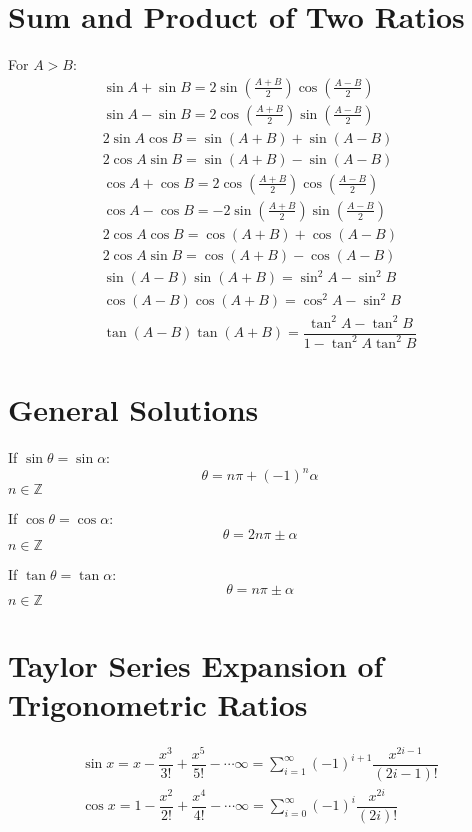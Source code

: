 \section{Sum and Product of Two Ratios}
For $A>B$:
\begin{align}
	\sin A+\sin B=2 \sin \left(\frac{A+B}{2}\right)\cos \left(\frac{A-B}{2}\right)\\
	\sin A-\sin B=2 \cos \left(\frac{A+B}{2}\right)\sin \left(\frac{A-B}{2}\right)\\
	2\sin A\cos B=\sin(A+B)+\sin(A-B)\\
	2\cos A\sin B=\sin(A+B)-\sin(A-B)\\
	\cos A+\cos B=2 \cos \left(\frac{A+B}{2}\right)\cos \left(\frac{A-B}{2}\right)\\
	\cos A-\cos B=-2 \sin \left(\frac{A+B}{2}\right)\sin \left(\frac{A-B}{2}\right)\\
	2 \cos A\cos B=\cos (A+B)+\cos (A-B)\\
	2 \cos A\sin B=\cos (A+B)-\cos (A-B)\\
	\sin (A-B)\sin(A+B)=\sin^2 A-\sin^2 B\\
	\cos (A-B)\cos(A+B)=\cos^2 A-\sin^2 B\\
	\tan (A-B)\tan(A+B)=\dfrac{\tan^2 A-\tan^2 B}{1-\tan^2 A\tan^2 B}
\end{align}


\section{General Solutions}
If $\sin \theta=\sin \alpha$:
\begin{equation}
	\theta=n\pi+(-1)^n\alpha
\end{equation}
$n\in\mathbb{Z}$

If $\cos \theta=\cos \alpha$:
\begin{equation}
	\theta=2n\pi\pm\alpha
\end{equation}
$n\in\mathbb{Z}$

If $\tan \theta=\tan \alpha$:
\begin{equation}
	\theta=n\pi\pm\alpha
\end{equation}
$n\in\mathbb{Z}$


\section{Taylor Series Expansion of Trigonometric Ratios}
\begin{align}
	\sin x=x-\dfrac{x^3}{3!}+\dfrac{x^5}{5!}-\cdots\infty=\sum_{i=1}^\infty (-1)^{i+1}\dfrac{x^{2i-1}}{(2i-1)!}\\
	\cos x=1-\dfrac{x^2}{2!}+\dfrac{x^4}{4!}-\cdots\infty=\sum_{i=0}^\infty (-1)^i\dfrac{x^{2i}}{(2i)!}
\end{align}
